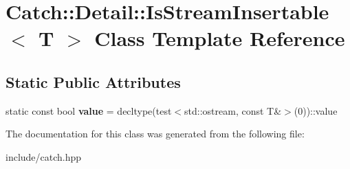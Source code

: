 \hypertarget{classCatch_1_1Detail_1_1IsStreamInsertable}{}\section{Catch\+:\+:Detail\+:\+:Is\+Stream\+Insertable$<$ T $>$ Class Template Reference}
\label{classCatch_1_1Detail_1_1IsStreamInsertable}
\subsection*{Static Public Attributes}
\begin{DoxyCompactItemize}
\item 
static const bool {\bfseries value} = decltype(test$<$std\+::ostream, const T\&$>$(0))\+::value\hypertarget{classCatch_1_1Detail_1_1IsStreamInsertable_a42818b09ae5851126a70ee263769e309}{}\label{classCatch_1_1Detail_1_1IsStreamInsertable_a42818b09ae5851126a70ee263769e309}

\end{DoxyCompactItemize}


The documentation for this class was generated from the following file\+:\begin{DoxyCompactItemize}
\item 
include/catch.\+hpp\end{DoxyCompactItemize}
